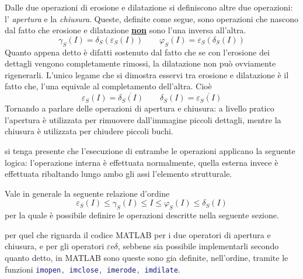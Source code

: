 \documentclass{subfiles}
\begin{document}
Dalle due operazioni di erosione e dilatazione si definiscono altre due operazioni: l' \emph{apertura} e la \emph{chiusura}.
Queste, definite come segue, sono operazioni che nascono dal fatto che erosione e dilatazione \underline{\textbf{non}} sono l'una inversa all'altra.
\[
    \gamma_{S}(I) = \delta_{S}(\varepsilon_{S}(I)) \qquad \varphi_{S}(I) = \varepsilon_{S}(\delta_{S}(I))
\]
Quanto appena detto è difatti sostenuto dal fatto che se con l'erosione dei dettagli vengono completamente rimossi, la dilatazione non può ovviamente rigenerarli.
L'unico legame che si dimostra esservi tra erosione e dilatazione è il fatto che, l'una equivale al completamento dell'altra. Cioè
\[
    \varepsilon_{S}(I) = \overline{\delta_{S}(I)} \qquad \delta_{S}(I) = \overline{\varepsilon_{S}(I)}
\]
Tornando a parlare delle operazioni di apertura e chiusura: a livello pratico l'apertura è utilizzata per rimuovere dall'immagine piccoli dettagli,
mentre la chiusura è utilizzata per chiudere piccoli buchi.


\begin{Remark*}
    si tenga presente che l'esecuzione di entrambe le operazioni applicano la seguente logica: l'operazione interna è effettuata normalmente,
    quella esterna invece è effettuata ribaltando lungo ambo gli assi l'elemento strutturale.
\end{Remark*}

Vale in generale la seguente relazione d'ordine
\[
    \varepsilon_{S}(I) \le \gamma_{S}(I) \le I \le \varphi_{S}(I) \le \delta_{S}(I)
\]
per la quale è possibile definire le operazioni descritte nella seguente sezione.

\begin{Note*}
    per quel che riguarda il codice MATLAB per i due operatori di apertura e chiusura, e per gli operatori \(\varepsilon \text{e} \delta\),
    sebbene sia possibile implementarli secondo quanto detto, in MATLAB sono queste sono gia definite, nell'ordine,
    tramite le funzioni \lstinline[language = MATLAB]{imopen, imclose, imerode, imdilate}.
\end{Note*}
\end{document}
